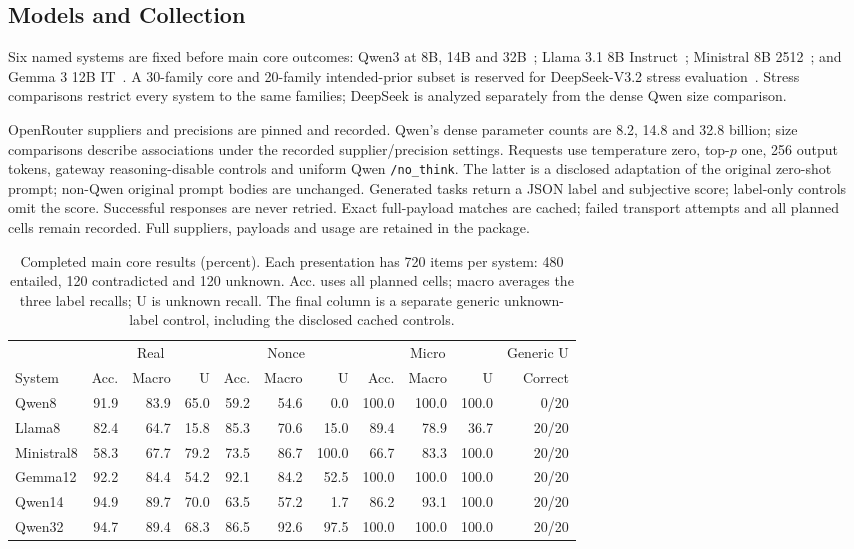 \documentclass[sigconf,anonymous,review]{acmart}
\begin{document}
\subsection{Models and Collection}
Six named systems are fixed before main core outcomes: Qwen3 at 8B, 14B and 32B~\cite{qwen2025}; Llama 3.1 8B Instruct~\cite{llama2024}; Ministral 8B 2512~\cite{ministral2025}; and Gemma 3 12B IT~\cite{gemma2025}. A 30-family core and 20-family intended-prior subset is reserved for DeepSeek-V3.2 stress evaluation~\cite{deepseek2025}. Stress comparisons restrict every system to the same families; DeepSeek is analyzed separately from the dense Qwen size comparison.

OpenRouter suppliers and precisions are pinned and recorded. Qwen's dense parameter counts are 8.2, 14.8 and 32.8 billion; size comparisons describe associations under the recorded supplier/precision settings. Requests use temperature zero, top-$p$ one, 256 output tokens, gateway reasoning-disable controls and uniform Qwen \texttt{/no\_think}. The latter is a disclosed adaptation of the original zero-shot prompt; non-Qwen original prompt bodies are unchanged. Generated tasks return a JSON label and subjective score; label-only controls omit the score. Successful responses are never retried. Exact full-payload matches are cached; failed transport attempts and all planned cells remain recorded. Full suppliers, payloads and usage are retained in the package.

\begin{table}[t]
\centering
\caption{Completed main core results (percent). Each presentation has 720 items per system: 480 entailed, 120 contradicted and 120 unknown. Acc. uses all planned cells; macro averages the three label recalls; U is unknown recall. The final column is a separate generic unknown-label control, including the disclosed cached controls. }
\label{tab:core_results}
\setlength{\tabcolsep}{4pt}
\begin{tabular}{lrrrrrrrrrr}
\toprule
 & \multicolumn{3}{c}{Real} & \multicolumn{3}{c}{Nonce} & \multicolumn{3}{c}{Micro} & Generic U\\
System & Acc. & Macro & U & Acc. & Macro & U & Acc. & Macro & U & Correct\\
\midrule
Qwen8 & 91.9 & 83.9 & 65.0 & 59.2 & 54.6 & 0.0 & 100.0 & 100.0 & 100.0 & 0/20 \\
Llama8 & 82.4 & 64.7 & 15.8 & 85.3 & 70.6 & 15.0 & 89.4 & 78.9 & 36.7 & 20/20 \\
Ministral8 & 58.3 & 67.7 & 79.2 & 73.5 & 86.7 & 100.0 & 66.7 & 83.3 & 100.0 & 20/20 \\
Gemma12 & 92.2 & 84.4 & 54.2 & 92.1 & 84.2 & 52.5 & 100.0 & 100.0 & 100.0 & 20/20 \\
Qwen14 & 94.9 & 89.7 & 70.0 & 63.5 & 57.2 & 1.7 & 86.2 & 93.1 & 100.0 & 20/20 \\
Qwen32 & 94.7 & 89.4 & 68.3 & 86.5 & 92.6 & 97.5 & 100.0 & 100.0 & 100.0 & 20/20 \\
\bottomrule
\end{tabular}
\end{table}
\end{document}
